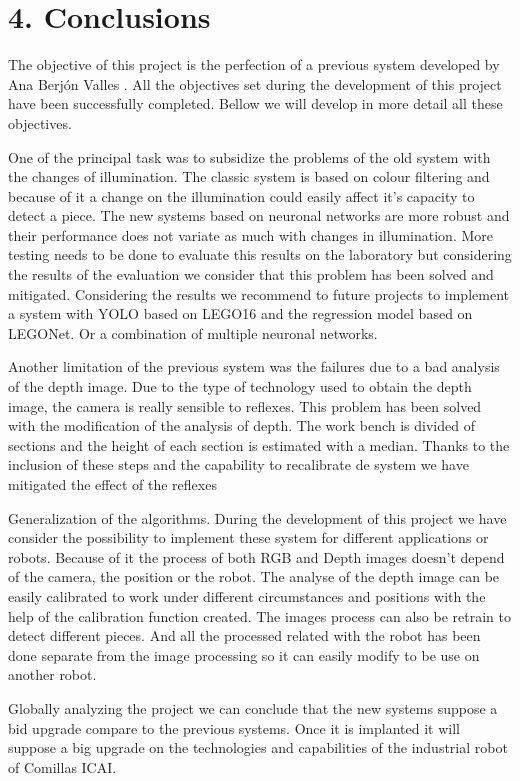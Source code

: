 {\section*{4. Conclusions}
The objective of this project is the perfection of a previous system developed by Ana Berjón Valles \citep{TFGAna}. All the objectives set during the development of this project have been successfully completed. Bellow we will develop in more detail all these objectives.

One of the principal task was to subsidize the problems of the old system with the changes of illumination. The classic system is based on colour filtering and because of it a change on the illumination could easily affect it's capacity to detect a piece. The new systems based on neuronal networks are more robust and their performance does not variate as much with changes in illumination. More testing needs to be done to evaluate this results on the laboratory but considering the results of the evaluation we consider that this problem has been solved and mitigated. Considering the results we recommend to future projects to implement a system with YOLO based on LEGO16 and the regression model based on LEGONet. Or a combination of multiple neuronal networks.

Another limitation of the previous system was the failures due to a bad analysis of the depth image. Due to the type of technology used to obtain the depth image, the camera is really sensible to reflexes. This problem has been solved with the modification of the analysis of depth. The work bench is divided of sections and the height of each section is estimated with a median. Thanks to the inclusion of these steps and the capability to recalibrate de system we have mitigated the effect of the reflexes

Generalization of the algorithms. During the development of this project we have consider the possibility to implement these system for different applications or robots. Because of it the process of both RGB and Depth images doesn't depend of the camera, the position or the robot. The analyse of the depth image can be easily calibrated to work under different circumstances and positions with the help of the calibration function created. The images process can also be retrain to detect different pieces. And all the processed related with the robot has been done separate from the image processing so it can easily modify to be use on another robot.

Globally analyzing the project we can conclude that the new systems suppose a bid upgrade compare to the previous systems. Once it is implanted it will suppose a big upgrade on the technologies and capabilities of the industrial robot of Comillas ICAI.
}